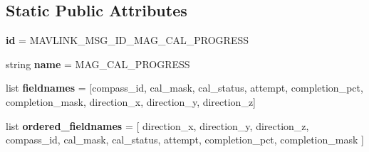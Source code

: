 \subsection*{Static Public Attributes}
\begin{DoxyCompactItemize}
\item 
\mbox{\label{classpymavlink_1_1dialects_1_1v10_1_1MAVLink__mag__cal__progress__message_a3ef624c86630f5d4623b2b2aac074a06}} 
{\bfseries id} = M\+A\+V\+L\+I\+N\+K\+\_\+\+M\+S\+G\+\_\+\+I\+D\+\_\+\+M\+A\+G\+\_\+\+C\+A\+L\+\_\+\+P\+R\+O\+G\+R\+E\+SS
\item 
\mbox{\label{classpymavlink_1_1dialects_1_1v10_1_1MAVLink__mag__cal__progress__message_ae020d2d08e3b57dce9716a9d72c762cc}} 
string {\bfseries name} = \textquotesingle{}M\+A\+G\+\_\+\+C\+A\+L\+\_\+\+P\+R\+O\+G\+R\+E\+SS\textquotesingle{}
\item 
\mbox{\label{classpymavlink_1_1dialects_1_1v10_1_1MAVLink__mag__cal__progress__message_ade696b98308414e812ecd150753bab34}} 
list {\bfseries fieldnames} = \mbox{[}\textquotesingle{}compass\+\_\+id\textquotesingle{}, \textquotesingle{}cal\+\_\+mask\textquotesingle{}, \textquotesingle{}cal\+\_\+status\textquotesingle{}, \textquotesingle{}attempt\textquotesingle{}, \textquotesingle{}completion\+\_\+pct\textquotesingle{}, \textquotesingle{}completion\+\_\+mask\textquotesingle{}, \textquotesingle{}direction\+\_\+x\textquotesingle{}, \textquotesingle{}direction\+\_\+y\textquotesingle{}, \textquotesingle{}direction\+\_\+z\textquotesingle{}\mbox{]}
\item 
\mbox{\label{classpymavlink_1_1dialects_1_1v10_1_1MAVLink__mag__cal__progress__message_a36f4d491f5b3896a94d8274df5b7c98d}} 
list {\bfseries ordered\+\_\+fieldnames} = \mbox{[} \textquotesingle{}direction\+\_\+x\textquotesingle{}, \textquotesingle{}direction\+\_\+y\textquotesingle{}, \textquotesingle{}direction\+\_\+z\textquotesingle{}, \textquotesingle{}compass\+\_\+id\textquotesingle{}, \textquotesingle{}cal\+\_\+mask\textquotesingle{}, \textquotesingle{}cal\+\_\+status\textquotesingle{}, \textquotesingle{}attempt\textquotesingle{}, \textquotesingle{}completion\+\_\+pct\textquotesingle{}, \textquotesingle{}completion\+\_\+mask\textquotesingle{} \mbox{]}

\end{DoxyCompactItemize}
